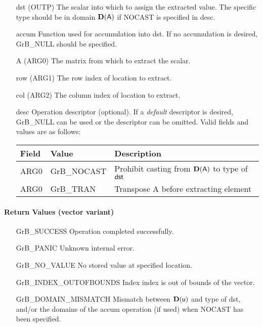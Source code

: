 \begin{itemize}[leftmargin=1in]
    \item[{\sf dst}]   ({\sf OUTP}) The scalar into which to assign the extracted value.  The specific type should be in domain $\bold{D}({\sf A})$ if {\sf NOCAST} is specified in {\sf desc}.
    \item[{\sf accum}] Function used for accumulation into dst. If no accumulation is desired,
                        {\sf GrB\_NULL} should be specified.
    \item[{\sf A}]   ({\sf ARG0}) The matrix from which to extract the scalar.
    \item[{\sf row}]     ({\sf ARG1}) The row index of location to extract.
    \item[{\sf col}]     ({\sf ARG2}) The column index of location to extract.

    \item[{\sf desc}]   Operation descriptor (optional). If a
    \emph{default} descriptor is desired, {\sf GrB\_NULL} can be
    used or the descriptor can be omitted.  Valid fields and values are as follows: \\
    \begin{tabular}{lll}
    Field  & Value & Description \\
    \hline
    {\sf ARG0} & {\sf GrB\_NOCAST} & Prohibit casting from $\bold{D}({\sf A})$ to type of ${\sf dst}$ \\
    {\sf ARG0} & {\sf GrB\_TRAN} &  Transpose {\sf A} before extracting element \\
    \end{tabular}

\end{itemize}

\paragraph{Return Values (vector variant)}

\begin{itemize}[leftmargin=2.1in]
\item[{\sf GrB\_SUCCESS}]          Operation completed successfully.
\item[{\sf GrB\_PANIC}]            Unknown internal error.
\item[{\sf GrB\_NO\_VALUE}]        No stored value at specified location.
\item[{\sf GrB\_INDEX\_OUTOFBOUNDS}]  Index {\sf index} is out of 
                                      bounds of the vector. 
\item[{\sf GrB\_DOMAIN\_MISMATCH}]    Mismatch between $\bold{D}(\sf u)$ and type of {\sf dst},
                                      and/or the domains of the 
                                      {\sf accum} operation (if used) when {\sf NOCAST} has
                                      been specified.
\end{itemize}

